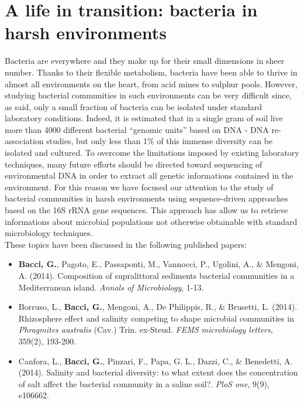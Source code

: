 \logvartrue
\chapter{A life in transition: bacteria in harsh environments}
Bacteria are everywhere and they make up for their small dimensions in sheer number. Thanks to their flexible metabolism, bacteria have been able to thrive in almost all environments on the heart, from acid mines to sulphur pools. However, studying bacterial communities in such environments can be very difficult since, as said, only a small fraction of bacteria can be isolated under standard laboratory conditions. Indeed, it is estimated that in a single gram of soil live more than 4000 different bacterial ``genomic units'' based on DNA - DNA re-association studies, but only less than 1\% of this immense diversity can be isolated and cultured. To overcome the limitations imposed by existing laboratory techniques, many future efforts should be directed  toward sequencing of environmental DNA in order to extract all genetic informations contained in the environment. For this reason we have focused our attention to the study of bacterial communities in harsh environments using sequence-driven approaches based on the 16S rRNA gene sequences. This approach has allow us to retrieve informations about microbial populations not otherwise obtainable with standard microbiology techniques.\\
These topics have been discussed in the following published papers:\\
\vspace{-2mm}
\begin{itemize}[nosep]
\item \textbf{Bacci, G.}, Pagoto, E., Passaponti, M., Vannocci, P., Ugolini, A., \& Mengoni, A. (2014). Composition of supralittoral sediments bacterial communities in a Mediterranean island. \textit{Annals of Microbiology}, 1-13.\\
\item Borruso, L., \textbf{Bacci, G.}, Mengoni, A., De Philippis, R., \& Brusetti, L. (2014). Rhizosphere effect and salinity competing to shape microbial communities in \textit{Phragmites australis} (Cav.) Trin. ex-Steud. \textit{FEMS microbiology letters}, 359(2), 193-200.\\
\item Canfora, L., \textbf{Bacci, G.}, Pinzari, F., Papa, G. L., Dazzi, C., \& Benedetti, A. (2014). Salinity and bacterial diversity: to what extent does the concentration of salt affect the bacterial community in a saline soil?. \textit{PloS one}, 9(9), e106662.\\
\end{itemize}


